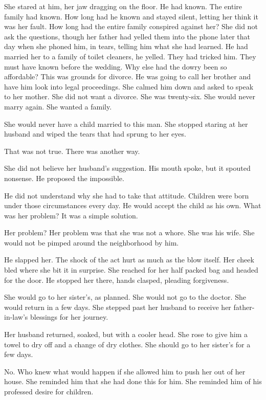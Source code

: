 \documentclass{article}
\begin{document}
She stared at him, her jaw dragging on the floor. He had known. The entire family had known. How long had he known and stayed silent, letting her think it was her fault. How long had the entire family conspired against her? She did not ask the questions, though her father had yelled them into the phone later that day when she phoned him, in tears, telling him what she had learned. He had married her to a family of toilet cleaners, he yelled. They had tricked him. They must have known before the wedding. Why else had the dowry been so affordable? This was grounds for divorce. He was going to call her brother and have him look into legal proceedings. She calmed him down and asked to speak to her mother. She did not want a divorce. She was twenty-six. She would never marry again. She wanted a family.

She would never have a child married to this man. She stopped staring at her husband and wiped the tears that had sprung to her eyes.

That was not true. There was another way. 

She did not believe her husband's suggestion. His mouth spoke, but it spouted nonsense. He proposed the impossible.

He did not understand why she had to take that attitude. Children were born under those circumstances every day. He would accept the child as his own. What was her problem? It was a simple solution.

Her problem? Her problem was that she was not a whore. She was his wife. She would not be pimped around the neighborhood by him.

He slapped her. The shock of the act hurt as much as the blow itself. Her cheek bled where she bit it in surprise. She reached for her half packed bag and headed for the door. He stopped her there, hands clasped, pleading forgiveness. 

She would go to her sister's, as planned. She would not go to the doctor. She would return in a few days. She stepped past her husband to receive her father-in-law's blessings for her journey.

Her husband returned, soaked, but with a cooler head. She rose to give him a towel to dry off and a change of dry clothes. She should go to her sister's for a few days.

No. Who knew what would happen if she allowed him to push her out of her house. She reminded him that she had done this for him. She reminded him of his professed desire for children. 
\end{document}
